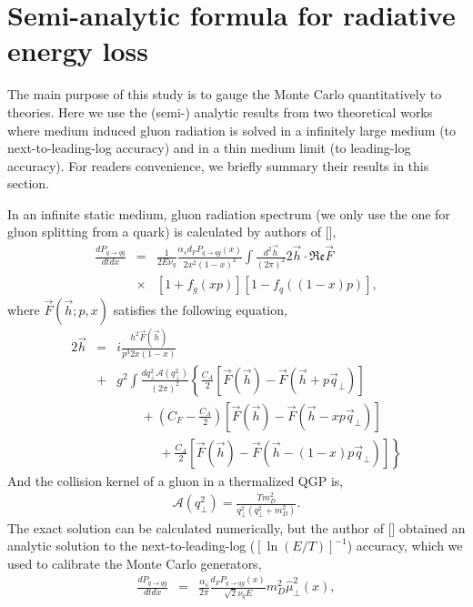 \documentclass[aps, prc, reprint, amsmath, groupedaddress, nofootinbib]{revtex4-1}
\begin{document}
\section{Semi-analytic formula for radiative energy loss}\label{section:Theo}
The main purpose of this study is to gauge the Monte Carlo quantitatively to theories.
Here we use the (semi-) analytic results from two theoretical works where medium induced gluon radiation is solved in a infinitely large medium (to next-to-leading-log accuracy) and in a thin medium limit (to leading-log accuracy).
For readers convenience, we briefly summary their results in this section.

In an infinite static medium, gluon radiation spectrum (we only use the one for gluon splitting from a quark) is calculated by authors of [],
\begin{eqnarray}\label{eq:AMY-1}
\nonumber
\frac{dP_{q\rightarrow qg}}{dt dx} &=& \frac{1}{2E\nu_q} \frac{\alpha_s d_F P_{q\rightarrow qg}(x)}{2x^2(1-x)^2}\int\frac{d^2\vec{h}}{(2\pi)^2}2\vec{h}\cdot \mathfrak{Re} \vec{F} \\
&\times& [1+f_g(xp)][1-f_q((1-x)p)],
\end{eqnarray}
where $\vec{F}(\vec{h}; p, x)$ satisfies the following equation,
\begin{eqnarray}\label{eq:AMY-2}
\nonumber
2\vec{h} &=& i\frac{h^2 \vec{F}(\vec{h})}{p^3 2x(1-x)} \\
\nonumber
&+& g^2\int \frac{dq_\perp^2 \mathcal{A}(q_\perp^2)}{(2\pi)^2}\left\{\frac{C_A}{2}\left[\vec{F}(\vec{h}) - \vec{F}(\vec{h}+p\vec{q}_\perp)\right]\right. \\
\nonumber
&& \phantom{ssss} + \left(C_F - \frac{C_A}{2}\right)\left[\vec{F}(\vec{h}) - \vec{F}(\vec{h}-xp\vec{q}_\perp)\right] \\
&& \phantom{sssssss} + \left. \frac{C_A}{2}\left[\vec{F}(\vec{h}) - \vec{F}(\vec{h}-(1-x)p\vec{q}_\perp)\right] \right\}
\end{eqnarray}
And the collision kernel of a gluon in a thermalized QGP is,
\begin{eqnarray}
\mathcal{A}(q_\perp^2) = \frac{T m_D^2}{q_\perp^2(q_\perp^2+m_D^2)}.
\end{eqnarray}
The exact solution can be calculated numerically, but the author of [] obtained an analytic solution to the next-to-leading-log ($[\ln(E/T)]^{-1}$) accuracy, which we used to calibrate the Monte Carlo generators,
\begin{eqnarray}\label{eq:AMY-NLL}
\frac{dP_{q\rightarrow qg}}{dt dx} &=& \frac{\alpha_s}{2\pi}\frac{ d_F P_{q\rightarrow qg}(x)}{\sqrt{2}\nu_q E} m_D^2 \hat{\mu}_\perp^2(x),
\end{eqnarray}
\end{document}
